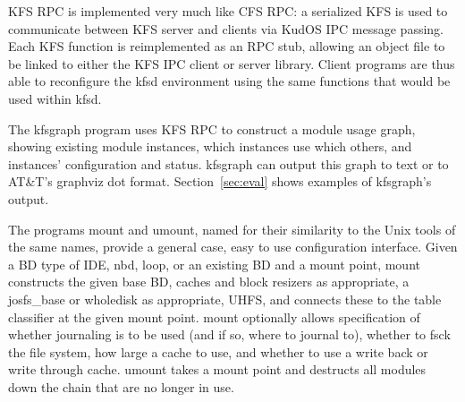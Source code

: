 KFS RPC is implemented very much like CFS RPC: a serialized KFS is used to
communicate between KFS server and clients via KudOS IPC message passing.  Each
KFS function is reimplemented as an RPC stub, allowing an object file to be
linked to either the KFS IPC client or server library. Client programs are thus
able to reconfigure the kfsd environment using the same functions that would be
used within kfsd.

The kfsgraph program uses KFS RPC to construct a module usage graph, showing
existing module instances, which instances use which others, and instances'
configuration and status. kfsgraph can output this graph to text or to AT\&T's
graphviz dot format. Section~\ref{sec:eval} shows examples of kfsgraph's output.

The programs mount and umount, named for their similarity to the Unix tools of
the same names, provide a general case, easy to use configuration interface.
Given a BD type of IDE, nbd, loop, or an existing BD and a mount point, mount
constructs the given base BD, caches and block resizers as appropriate, a
josfs\_base or wholedisk as appropriate, UHFS, and connects these to the table
classifier at the given mount point. mount optionally allows specification of
whether journaling is to be used (and if so, where to journal to), whether to
fsck the file system, how large a cache to use, and whether to use a write back
or write through cache. umount takes a mount point and destructs all modules
down the chain that are no longer in use.
